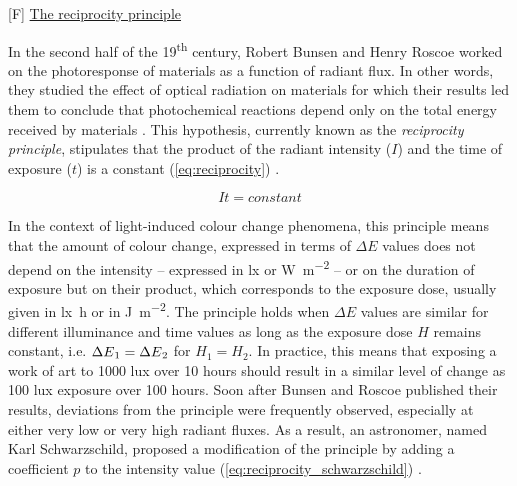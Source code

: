 [F] \underline{The reciprocity principle}

In the second half of the 19\textsuperscript{th} century, Robert Bunsen and Henry Roscoe worked on the photoresponse of materials as a function of radiant flux. In other words, they studied the effect of optical radiation on materials for which their results led them to conclude that photochemical reactions depend only on the total energy received by materials \citep{bunsen_photochemische_1859}. This hypothesis, currently known as the \textit{reciprocity principle}, stipulates that the product of the radiant intensity ($I$) and the time of exposure ($t$) is a constant (\ref{eq:reciprocity}) \citep[293]{martin_reciprocity_2003}.

\begin{equation}
    It = constant
\label{eq:reciprocity}
\end{equation}


In the context of light-induced colour change phenomena, this principle means that the amount of colour change, expressed in terms of $\Delta E$ values does not depend on the intensity – expressed in \unit{\lux} or \unit{\watt\per\square\metre} – or on the duration of exposure but on their product, which corresponds to the exposure dose, usually given in \unit{\lux\hour} or in \unit{\joule\per\square\metre}. The principle holds when $\Delta E$ values are similar for different illuminance and time values as long as the exposure dose $H$ remains constant, i.e. $\Delta E\textsubscript{1} = \Delta E\textsubscript{2}$ for $H_1 = H_2$. In practice, this means that exposing a work of art to 1000 lux over 10 hours should result in a similar level of change as 100 lux exposure over 100 hours. Soon after Bunsen and Roscoe published their results, deviations from the principle were frequently observed, especially at either very low or very high radiant fluxes. As a result, an astronomer, named Karl Schwarzschild, proposed a modification of the principle by adding a coefficient $p$ to the intensity value (\ref{eq:reciprocity_schwarzschild}) \citep[293]{martin_reciprocity_2003}.

